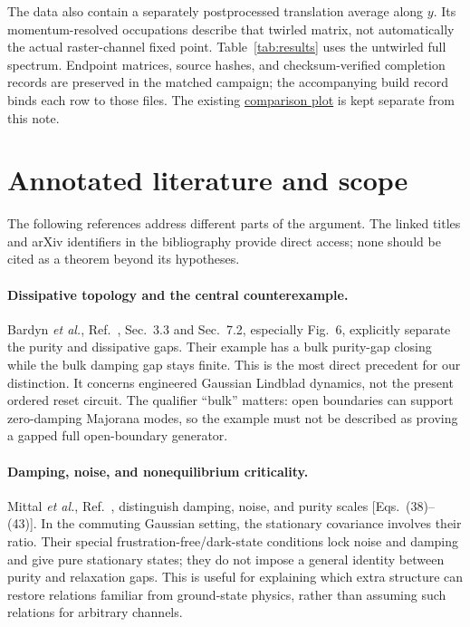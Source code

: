 \documentclass[aps,prb,twocolumn,nofootinbib,superscriptaddress]{revtex4-2}
\begin{document}
The data also contain a separately postprocessed translation average
along $y$. Its momentum-resolved occupations describe that twirled
matrix, not automatically the actual raster-channel fixed point.
Table~\ref{tab:results} uses the untwirled full spectrum. Endpoint
matrices, source hashes, and checksum-verified completion records are
preserved in the matched campaign; the accompanying build record binds
each row to those files. The existing
\href{../../../matched_markov_lindblad_campaign/steady_purity_gap_v1/results/20261005T184136Z/analysis/channel_and_stationary_purity_gaps.pdf}{comparison plot}
is kept separate from this note.

\section{Annotated literature and scope}
The following references address different parts of the argument.
The linked titles and arXiv identifiers in the bibliography provide
direct access; none should be cited as a theorem beyond its hypotheses.

\paragraph{Dissipative topology and the central counterexample.}
Bardyn \emph{et al.}, Ref.~\cite{Bardyn}, Sec.~3.3 and Sec.~7.2,
especially Fig.~6, explicitly separate the purity and dissipative gaps.
Their example has a bulk purity-gap closing while the bulk damping gap
stays finite. This is the most direct precedent for our distinction.
It concerns engineered Gaussian Lindblad dynamics, not the present
ordered reset circuit. The qualifier ``bulk'' matters: open boundaries
can support zero-damping Majorana modes, so the example must not be
described as proving a gapped full open-boundary generator.

\paragraph{Damping, noise, and nonequilibrium criticality.}
Mittal \emph{et al.}, Ref.~\cite{Mittal}, distinguish damping, noise, and
purity scales [Eqs.~(38)--(43)]. In the commuting Gaussian setting,
the stationary covariance involves their ratio. Their special
frustration-free/dark-state conditions lock noise and damping and
give pure stationary states; they do not impose a general identity
between purity and relaxation gaps. This is useful for explaining
which extra structure can restore relations familiar from ground-state
physics, rather than assuming such relations for arbitrary channels.
\end{document}
